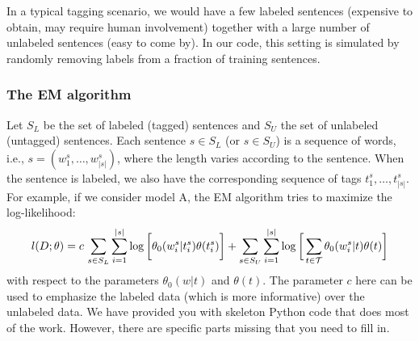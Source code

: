 In a typical tagging scenario, we would have a few labeled sentences (expensive to obtain, may require human involvement) together with a large number of unlabeled sentences (easy to come by). In our code, this setting is simulated by randomly removing labels from a fraction of training sentences. 

\subsubsection*{The EM algorithm} 

Let $S_L$ be the set of labeled (tagged) sentences and $S_U$ the set of unlabeled (untagged) sentences. Each sentence $s\in S_L$ (or $s\in S_U$) is a sequence of words, i.e., $s = (w^s_1,\ldots,w^s_{|s|})$, where the length varies according to the sentence. When the sentence is labeled, we also have the corresponding sequence of tags $t^s_1,\ldots,t^s_{|s|}$. For example, if we consider model A, the EM algorithm tries to maximize the log-likelihood:
\begin{equation}
l(D;\theta) = c\,\sum_{s\in S_L} \sum_{i=1}^{|s|}\log\bigg[ 
\theta_0(w^s_i|t^s_i)\theta(t^s_i)\bigg]
+ \sum_{s\in S_U} \sum_{i=1}^{|s|}\log\bigg[\sum_{t\in {\cal T}} 
\theta_0(w^s_i|t)\theta(t)\bigg]
\label{EMAlg}
\end{equation}
with respect to the parameters $\theta_0(w|t)$ and $\theta(t)$. The parameter $c$ here can be used to emphasize the labeled data (which is more informative) over the unlabeled data. We have provided you with skeleton Python code that does most of the work. However, there are specific parts missing that you need to fill in. 

